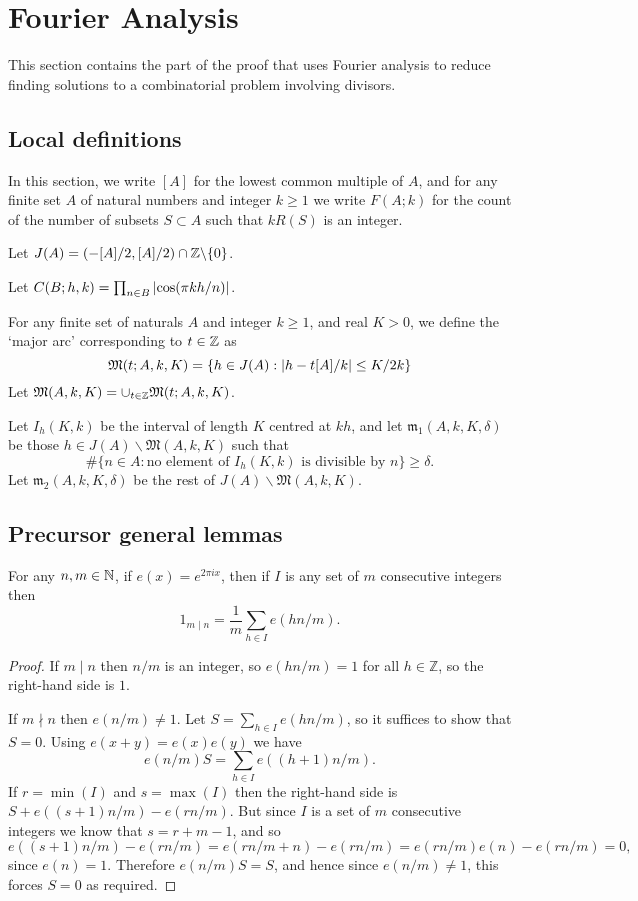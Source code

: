 \chapter{Fourier Analysis}
\label{chap:fourier}

This section contains the part of the proof that uses Fourier analysis to reduce finding solutions to a combinatorial problem involving divisors.
\section{Local definitions}
In this section, we write $[A]$ for the lowest common multiple of $A$, and for any finite set $A$ of natural numbers and integer $k\geq 1$ we write $F(A;k)$ for the count of the number of subsets $S\subset A$ such that $kR(S)$ is an integer.


Let $J(A) = (-[A]/2,[A]/2)\cap\mathbb{Z} \backslash \{0\}$.

Let $C(B;h,k) = \prod_{n\in B}\left\lvert \cos(\pi kh/n)\right\rvert$.

For any finite set of naturals $A$ and integer $k\geq 1$, and real $K>0$, we define the `major arc' corresponding to $t\in\mathbb{Z}$ as
\[\mathfrak{M}(t;A,k,K) = \{ h\in  J(A): \left\lvert h-t[A]/k\right\rvert\leq K/2k\}\]
Let $\mathfrak{M}(A,k,K) = \cup_{t\in \mathbb{Z}}\mathfrak{M}(t;A,k,K)$.


Let $I_h(K,k)$ be the interval of length $K$ centred at $kh$, and let $\mathfrak{m}_1(A,k,K,\delta)$ be those $h\in J(A)\backslash \mathfrak{M}(A,k,K)$ such that
\[\# \{ n\in A : \textrm{no element of }I_h(K,k)\textrm{ is divisible by }n\}\geq \delta.\]
Let $\mathfrak{m}_2(A,k,K,\delta)$ be the rest of $J(A)\backslash\mathfrak{M}(A,k,K)$.

\section{Precursor general lemmas}
\begin{lemma}\label{lem:orthogonality}
For any $n,m\in\mathbb{N}$, if $e(x) = e^{2\pi ix}$, then if $I$ is any set of $m$ consecutive integers then
\[1_{m\mid n}=\frac{1}{m}\sum_{h\in I}e(h n/m).\]
\end{lemma}
\begin{proof}
If $m\mid n$ then $n/m$ is an integer, so $e(hn/m)=1$ for all $h\in \mathbb{Z}$, so the right-hand side is $1$.

If $m\nmid n$ then $e(n/m)\neq 1$. Let $S=\sum_{h\in I}e(hn/m)$, so it suffices to show that $S=0$. Using $e(x+y)=e(x)e(y)$ we have
\[e(n/m)S = \sum_{h\in I}e((h+1)n/m).\]
If $r=\min(I)$ and $s=\max(I)$ then the right-hand side is $S + e((s+1)n/m)-e(rn/m)$. But since $I$ is a set of $m$ consecutive integers we know that $s=r+m-1$, and so
\[e((s+1)n/m)-e(rn/m) = e(rn/m+n)-e(rn/m)=e(rn/m)e(n)-e(rn/m)=0,\]
since $e(n)=1$. Therefore $e(n/m)S=S$, and hence since $e(n/m)\neq 1$, this forces $S=0$ as required.
\end{proof}

